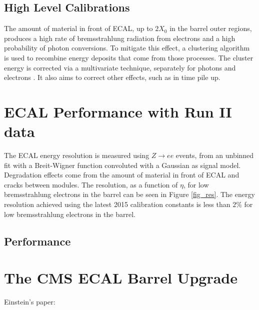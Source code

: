 \subsection{High Level Calibrations}

The amount of material in front of ECAL, up to $2X_0$ in the barrel outer regions, produces a high rate of bremsstrahlung radiation from electrons and a high probability of photon conversions. To mitigate this effect, a clustering algorithm is used to recombine energy deposits that come from those processes. The cluster energy is corrected via a multivariate technique, separately for photons \cite{photons} and electrons \cite{electrons}. It also aims to correct other effects, such as in time pile up.

\section{ECAL Performance with Run II data}

The ECAL energy resolution is measured using $Z\rightarrow ee$ events, from an unbinned fit with a Breit-Wigner function convoluted with a Gaussian as signal model. Degradation effects come from the amount of material in front of ECAL and cracks between modules. The resolution, as a function of $\eta$, for low bremsstrahlung electrons in the barrel can be seen in Figure \ref{fig_res}.
The energy resolution achieved using the latest 2015 calibration constants is less than $2\%$ for low bremsstrahlung electrons in the barrel.

\subsection{Performance}
\section{The CMS ECAL Barrel Upgrade}
Einstein's paper: \cite{Einstein}
